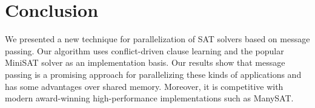 \documentclass[letterpaper, compsoc, conference]{IEEEtran}
\begin{document}
\section{Conclusion}
\label{sec:finish}

We presented a new technique for parallelization of SAT solvers based
on message passing. Our algorithm uses conflict-driven clause learning 
and the popular MiniSAT solver as an implementation basis. Our results show that 
message passing is a promising approach for parallelizing these kinds of 
applications and has some advantages over shared memory. Moreover, it is
competitive with modern award-winning high-performance implementations such as ManySAT.



\end{document}
